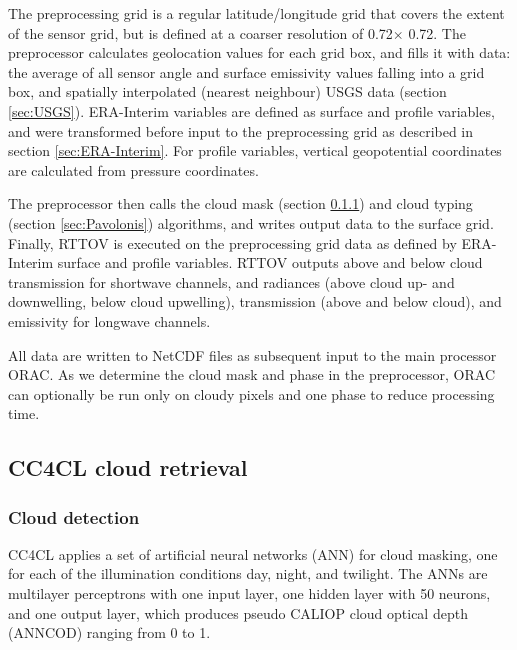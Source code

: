 The preprocessing grid is a regular latitude/longitude grid that covers the extent of the sensor grid, but is
defined at a coarser resolution of 0.72\textdegree $\times$ 0.72\textdegree. The preprocessor calculates
geolocation values for each grid box, and fills it with data: the average of all sensor angle and surface
emissivity values falling into a grid box, and spatially interpolated (nearest neighbour) USGS data (section
\ref{sec:USGS}). ERA-Interim variables are defined as surface and profile variables, and were transformed
before input to the preprocessing grid as described in section \ref{sec:ERA-Interim}. For profile variables,
vertical geopotential coordinates are calculated from pressure coordinates.

The preprocessor then calls the cloud mask (section \ref{sec:CloudMask}) and cloud typing (section
\ref{sec:Pavolonis}) algorithms, and writes output data to the surface grid. Finally, RTTOV is executed on the
preprocessing grid data as defined by ERA-Interim surface and profile variables. RTTOV outputs above and below
cloud transmission for shortwave channels, and radiances (above cloud up- and downwelling, below cloud
upwelling), transmission (above and below cloud), and emissivity for longwave channels.

All data are written to NetCDF files as subsequent input to the main processor ORAC. As we determine the cloud
mask and phase in the preprocessor, ORAC can optionally be run only on cloudy pixels and one phase to reduce
processing time.

\subsection{CC4CL cloud retrieval}

\subsubsection{Cloud detection}\label{sec:CloudMask}

CC4CL applies a set of artificial neural networks (ANN) for cloud masking, one for each of the illumination conditions day, night, and twilight. The ANNs are multilayer perceptrons with one input layer, one hidden layer with 50 neurons, and one output layer, which produces pseudo CALIOP cloud optical depth (ANNCOD) ranging from 0 to 1.

